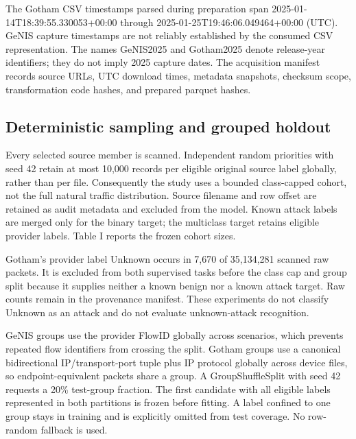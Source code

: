 \documentclass[journal,letterpaper]{IEEEtran}
\begin{document}
The Gotham CSV timestamps parsed during preparation span 2025-01-14T18:39:55.330053+00:00 through 2025-01-25T19:46:06.049464+00:00 (UTC). GeNIS capture timestamps are not reliably established by the consumed CSV representation. The names GeNIS2025 and Gotham2025 denote release-year identifiers; they do not imply 2025 capture dates. The acquisition manifest records source URLs, UTC download times, metadata snapshots, checksum scope, transformation code hashes, and prepared parquet hashes.

\subsection{Deterministic sampling and grouped holdout}
Every selected source member is scanned. Independent random priorities with seed 42 retain at most 10,000 records per eligible original source label globally, rather than per file. Consequently the study uses a bounded class-capped cohort, not the full natural traffic distribution. Source filename and row offset are retained as audit metadata and excluded from the model. Known attack labels are merged only for the binary target; the multiclass target retains eligible provider labels. Table I reports the frozen cohort sizes.

Gotham's provider label Unknown occurs in 7,670 of 35,134,281 scanned raw packets. It is excluded from both supervised tasks before the class cap and group split because it supplies neither a known benign nor a known attack target. Raw counts remain in the provenance manifest. These experiments do not classify Unknown as an attack and do not evaluate unknown-attack recognition.

GeNIS groups use the provider FlowID globally across scenarios, which prevents repeated flow identifiers from crossing the split. Gotham groups use a canonical bidirectional IP/transport-port tuple plus IP protocol globally across device files, so endpoint-equivalent packets share a group. A GroupShuffleSplit with seed 42 requests a 20\% test-group fraction. The first candidate with all eligible labels represented in both partitions is frozen before fitting. A label confined to one group stays in training and is explicitly omitted from test coverage. No row-random fallback is used.
\end{document}

